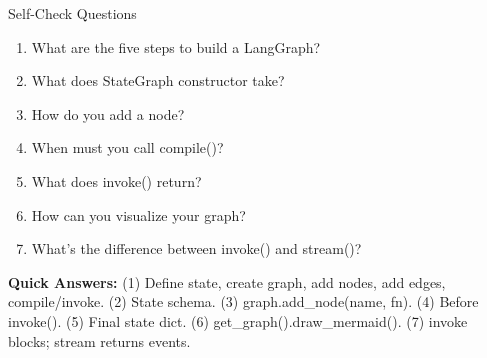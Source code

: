 \documentclass[aspectratio=169,11pt]{beamer}
\begin{document}
\begin{frame}[t,shrink=5]{Self-Check Questions}
\setlength{\itemsep}{0pt}
\vspace{0.05cm}

{\footnotesize
\begin{enumerate}
\setlength{\itemsep}{0.5pt}
  \item What are the five steps to build a LangGraph?
  \item What does StateGraph constructor take?
  \item How do you add a node?
  \item When must you call compile()?
  \item What does invoke() return?
  \item How can you visualize your graph?
  \item What's the difference between invoke() and stream()?
\end{enumerate}

\vspace{0.05cm}

\textbf{Quick Answers:} (1) Define state, create graph, add nodes, add edges, compile/invoke. (2) State schema. (3) graph.add\_node(name, fn). (4) Before invoke(). (5) Final state dict. (6) get\_graph().draw\_mermaid(). (7) invoke blocks; stream returns events.
}
\end{frame}
\end{document}
